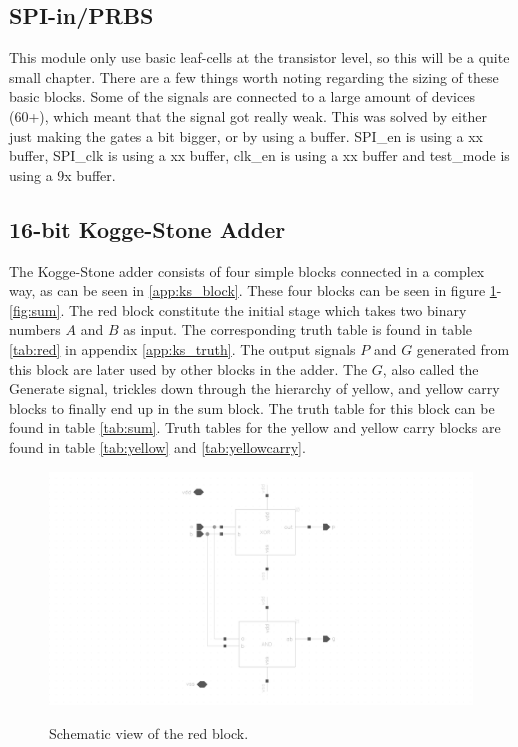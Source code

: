 
\subsection{SPI-in/PRBS}
This module only use basic leaf-cells at the transistor level, so this will be a quite small chapter. There are a few things worth noting regarding the sizing of these basic blocks. Some of the signals are connected to a large amount of devices (60+), which meant that the signal got really weak. This was solved by either just making the gates a bit bigger, or by using a buffer. SPI\_en is using a xx buffer, SPI\_clk is using a xx buffer, clk\_en is using a xx buffer and test\_mode is using a 9x buffer.

\subsection{16-bit Kogge-Stone Adder}
The Kogge-Stone adder consists of four simple blocks connected in a complex way, as can be seen in \ref{app:ks_block}. These four blocks can be seen in figure \ref{fig:red}-\ref{fig:sum}. The red block constitute the initial stage which takes two binary numbers $A$ and $B$ as input. The corresponding truth table is found in table \ref{tab:red} in appendix \ref{app:ks_truth}. The output signals $P$ and $G$ generated from this block are later used by other blocks in the adder. The $G$, also called the Generate signal, trickles down through the hierarchy of yellow, and yellow carry blocks to finally end up in the sum block. The truth table for this block can be found in table \ref{tab:sum}. Truth tables for the yellow and yellow carry blocks are found in table \ref{tab:yellow} and \ref{tab:yellowcarry}.

\begin{figure}[H]
  \centering
  \captionsetup{justification=centering}
  {\includegraphics[width=2.0\textwidth]{../figures/red}}
  \caption{Schematic view of the red block.} \label{fig:red}
\end{figure}

